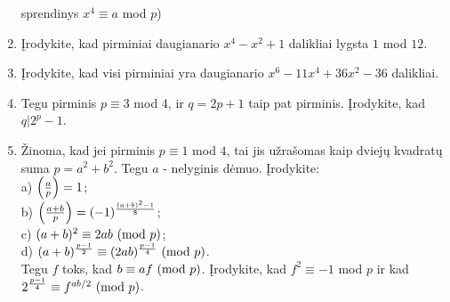 \begin{enumerate}
    sprendinys $x^4 \equiv a$ mod $p$) 
  \item Įrodykite, kad pirminiai daugianario $x^4 - x^2 + 1$ dalikliai
    lygsta $1$ mod $12$. 
  \item Įrodykite, kad visi pirminiai yra daugianario $x^6 - 11x^4 + 36x^2
    - 36$ dalikliai.
  \item Tegu pirminis $p\equiv 3$ mod $4$, ir $q=2p+1$ taip pat pirminis.
    Įrodykite, kad $q|2^p -1$.
  \item Žinoma, kad jei pirminis $p \equiv 1$ mod $4$, tai jis užrašomas kaip
    dviejų kvadratų suma $p = a^2 + b^2$. Tegu $a$ - nelyginis dėmuo.
    Įrodykite: \\
      a) $\left(\frac{a}{p}\right) = 1$;\\
      b) $\left(\frac{a+b}{p}\right) = (-1)^\frac{(a+b)^2 - 1}{8}$;\\
      c) $(a+b)^2 \equiv 2ab\ (\text{mod } p)$;\\
      d) $(a+b)^\frac{p-1}{2} \equiv (2ab)^\frac{p-1}{4}\ (\text{mod } p)$.\\
    Tegu $f$ toks, kad $b\equiv af \ (\text{mod } p)$. Įrodykite, kad $f^2 \equiv -1$
    mod $p$ ir kad $2^\frac{p-1}{4} \equiv f^{ab/2} \ (\text{mod } p)$. 


\end{enumerate}
